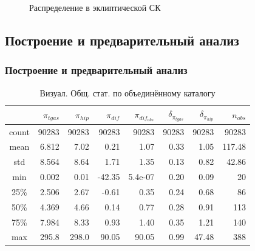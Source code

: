 \documentclass[14pt,aspectratio=43]{beamer}
\begin{document}
\begin{frame}[<alignment>]
\begin{figure}[h!]
\caption{Распределение в эклиптической СК}
\label{img:hiptgaslo}
\end{figure}
\end{frame}	



\subsection{Построение и предварительный анализ}\label{errvid}

\begin{frame}[squeeze, shrink=5]
\frametitle{Построение и предварительный анализ}
\begin{table}[h!]
\caption{Визуал. Общ. стат. по объединённому каталогу}
\label{tabular:tgas_st}
\begin{tabular}{c|r|r|r|r|r|r|r}
\hline 	
&$\pi_{tgas}$&$\pi_{hip}$&$\pi_{dif}$&$\pi_{dif_{abs}}$&$\delta_{\pi_{tgas}}$&$\delta_{\pi_{hip}}$&$n_{obs}$\\
\hline
\hline 	
count&90283&90283&90283&90283&90283&90283&90283\\
\hline 
mean&6.812&7.02&0.21&1.07&0.33&1.05&117.48\\
std&8.564&8.64&1.71&1.35&0.13&0.82&42.86\\
min&0.002&0.01&-42.35&5.4e-07&0.20&0.09&20\\
25\%&2.506&2.67&-0.61&0.35&0.24&0.68&86\\
50\%&4.369&4.66&0.14&0.77&0.28&0.91&113\\
75\%&7.984&8.33&0.93&1.40&0.35&1.21&140\\
max&295.8&298.0&90.05&90.05&0.99&47.48&388\\
\end{tabular}
\end{table}

\end{frame}	
\end{document}
